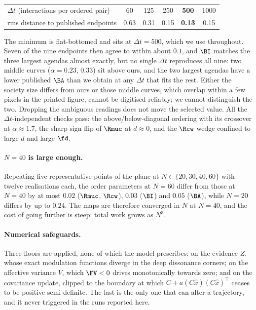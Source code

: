 \begin{table}[h]
\centering\small
\begin{tabular}{lccccc}
\toprule
$\Delta t$ (interactions per ordered pair) & 60 & 125 & 250 & \textbf{500} & 1000 \\
rms distance to published endpoints & 0.63 & 0.31 & 0.15 & \textbf{0.13} & 0.15 \\
\bottomrule
\end{tabular}
\end{table}

The minimum is flat-bottomed and sits at $\Delta t=500$, which we use throughout.
Seven of the nine endpoints then agree to within about $0.1$, and $\BI$ matches
the three largest agendas almost exactly, but no single $\Delta t$ reproduces all
nine: two middle curves ($\alpha=0.23$, $0.33$) sit above ours, and the two
largest agendas have a lower published $\BA$ than we obtain at any $\Delta t$ that
fits the rest. Either the society size differs from ours or those middle curves,
which overlap within a few pixels in the printed figure, cannot be digitised
reliably; we cannot distinguish the two. Dropping the ambiguous readings does not
move the selected value. All the $\Delta t$-independent checks pass: the
above/below-diagonal ordering with its crossover at $\alpha\approx1.7$, the sharp
sign flip of $\Rmuc$ at $d\approx0$, and the $\Rcw$ wedge confined to large $d$
and large $\fd$.

\paragraph{$N=40$ is large enough.} Repeating five representative points of the
plane at $N\in\{20,30,40,60\}$ with twelve realisations each, the order parameters
at $N=60$ differ from those at $N=40$ by at most $0.02$ ($\Rmuc$, $\Rcw$), $0.03$
($\BI$) and $0.05$ ($\BA$), while $N=20$ differs by up to $0.24$. The maps are
therefore converged in $N$ at $N=40$, and the cost of going further is steep: total
work grows as $N^{3}$.

\paragraph{Numerical safeguards.} Three floors are applied, none of which the
model prescribes: on the evidence $Z$, whose exact modulation functions diverge
in the deep dissonance corners; on the affective variance $V$, which $\FV<0$
drives monotonically towards zero; and on the covariance update, clipped to the
boundary at which $C+a(C\hat{x})(C\hat{x})^{\!\top}$ ceases to be positive
semi-definite. The last is the only one that can alter a trajectory, and it never
triggered in the runs reported here.
